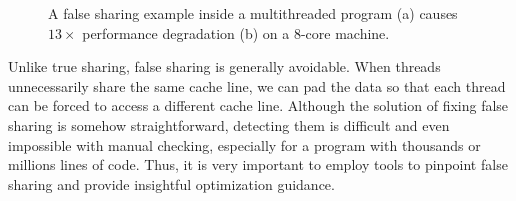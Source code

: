 \begin{figure}[htbp]
\centering
{}%
\hspace{20pt}
\caption{
A false sharing example inside a multithreaded program (a) causes $13\times$ performance degradation (b) on a 8-core machine.
\label{fig:penalty}}
\end{figure}


Unlike true sharing, false sharing is generally avoidable. When threads unnecessarily share the same cache line, we can pad the data so that each thread can be forced to access a different cache line. Although the solution of fixing false sharing is somehow straightforward, detecting them is difficult and even impossible with manual checking, especially for a program with thousands or millions lines of code. Thus, it is very important to employ tools to pinpoint false sharing and provide insightful optimization guidance.

